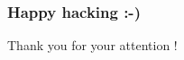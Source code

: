 
\begin{frame}
  \frametitle{Happy hacking :-)}
  \vspace{8em}
  \Huge{Thank you for your attention !}
\end{frame}
